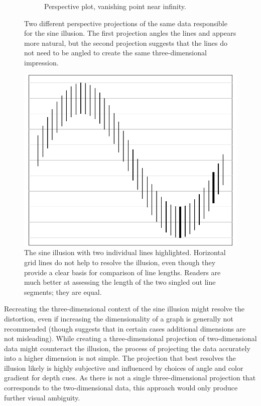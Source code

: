 \documentclass[11pt]{isuthesis}\usepackage[]{graphicx}\usepackage[]{color}
\begin{document}
\begin{figure}[h!tbp]
\begin{subfigure}[t]{.49\textwidth}
\caption{Perspective plot, vanishing point near infinity.\label{ribbon2}}
\end{subfigure}
\caption[Three-dimensional origins of the sine illusion]{Two different perspective projections of the same data responsible for the sine illusion. The first projection angles the lines and appears more natural, but the second projection suggests that the lines do not need to be angled to create the same three-dimensional impression.\label{ribbon}}
\end{figure}




\begin{figure}
\centering
\includegraphics[width=.4\textwidth]{fig-originalgrid}
\caption[Contextual origins of the sine illusion]{\label{fig:original-grid} The sine illusion with two individual lines highlighted. Horizontal grid lines do not help  to resolve the illusion, even though they provide a clear basis for comparison of line lengths. Readers are much better at assessing the length of the two singled out line segments; they are equal.}
\end{figure}

Recreating the three-dimensional context of the sine illusion might resolve the distortion, even if increasing the dimensionality of a graph is generally not recommended \citep{tufte, cleveland:1984} (though \citet{spence:1990} suggests that in certain cases additional dimensions are not misleading). While creating a three-dimensional projection of two-dimensional data might counteract the illusion, the process of projecting the data accurately into a higher dimension is not simple. The projection that best resolves the illusion likely is highly subjective and influenced by choices of angle and color gradient for depth cues. As there is not a single three-dimensional projection that corresponds to the two-dimensional data, this approach would only produce further visual ambiguity.
\end{document}
